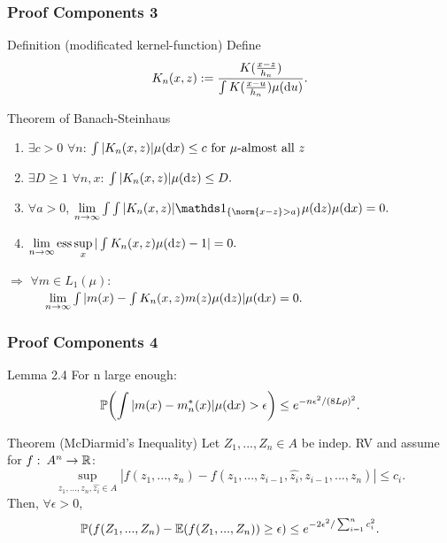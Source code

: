 \begin{frame}
\frametitle{Proof Components 3}

\begin{block}{Definition (modificated kernel-function)}
Define \[K_n(x,z) := \frac{K(\frac{x-z}{h_n})}{\int K(\frac{x-u}{h_n}) \mu(\mathop{}\!\mathrm{d}{u})}.\]  
\end{block}
\begin{block}{Theorem of Banach-Steinhaus}
\begin{enumerate} [label=(\roman*)]
    \item $\exists c>0$ $\forall n$: $\int |K_n(x,z)| \mu(\diff{x}) \leq c
        \text{   for $\mu$-almost all $z$}$
    \item $\exists D \geq 1$ $\forall n,x$: 
        $\int |K_n(x,z)| \mu(\diff{z}) \leq D.$
    \item $\forall a>0$,
        $ \lim\limits_{n \rightarrow \infty} \int \int |K_n(x,z)| \ind{\{ \norm{x-z} > a\}} \mu(\diff{z}) \mu(\diff{x}) = 0. $
    \item $\lim\limits_{n \rightarrow \infty} \text{ess}\sup\limits_{x} | \int K_n(x,z) \mu(\mathop{}\!\mathrm{d}{z})     -1 | = 0.$
\end{enumerate}
$\Longrightarrow$ $ \forall m \in L_1(\mu)$: \\
$\quad \quad \quad \lim\limits_{n \rightarrow \infty} \int | m(x) - \int K_n(x,z)m(z) \mu(\mathop{}\!\mathrm{d}{z}) | \mu(\mathop{}\!\mathrm{d}{x}) = 0.$
\end{block}

\end{frame}

\begin{frame}
\frametitle{Proof Components 4}
\begin{block}{Lemma 2.4}
For n large enough: \[\pro{\int |m(x) - m_n^*(x)| \mu(\dx) > \epsilon} \leq e^{-n\epsilon^2/(8L\rho)^2}. \]
\end{block}
\begin{block} {Theorem (McDiarmid's Inequality)}
    Let $Z_1,...,Z_n \in A$ be indep. RV and assume for $f:\: A^n \rightarrow \mathbb{R}$:
    \[
        \sup\limits_{z_1,...,z_n,\hat{z_i} \in A} |f(z_1,...,z_n) - f(z_1,...,z_{i-1},\hat{z_i}, z_{i-1},...,z_n)| \leq c_i.
    \]
    Then, $\forall \epsilon > 0$,
    \[
        \pro{f(Z_1,...,Z_n) - \ev{f(Z_1,...,Z_n)} \geq \epsilon} \leq e^{-2\epsilon^2/\sum_{i=1}^n c_i^2}.
    \]
\end{block}
\end{frame}

